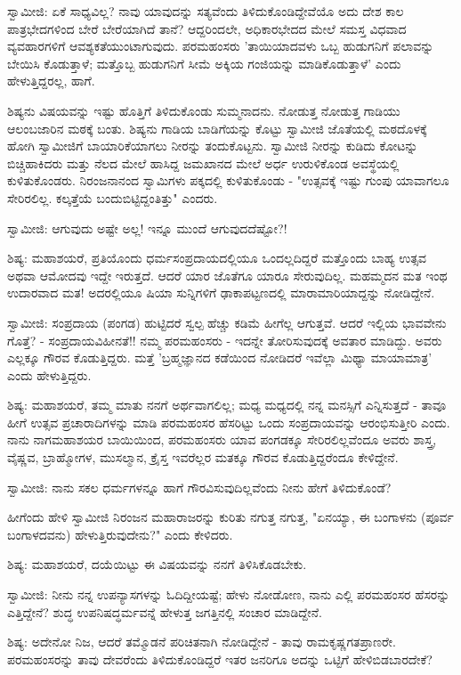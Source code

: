 ಸ್ವಾಮೀಜಿ: ಏಕೆ ಸಾಧ್ಯವಿಲ್ಲ? ನಾವು ಯಾವುದನ್ನು ಸತ್ಯವೆಂದು ತಿಳಿದುಕೊಂಡಿದ್ದೇವೆಯೊ ಅದು ದೇಶ ಕಾಲ ಪಾತ್ರಭೇದಗಳಿಂದ ಬೇರೆ ಬೇರೆಯಾಗಿದೆ ತಾನೆ? ಆದ್ದರಿಂದಲೇ, ಅಧಿಕಾರಭೇದದ ಮೇಲೆ ಸಮಸ್ತ ವಿಧವಾದ ವ್ಯವಹಾರಗಳಿಗೆ ಆವಶ್ಯಕತೆಯುಂಟಾಗುವುದು. ಪರಮಹಂಸರು 'ತಾಯಿಯಾದವಳು ಒಬ್ಬ ಹುಡುಗನಿಗೆ ಪಲಾವನ್ನು ಬೇಯಿಸಿ ಕೊಡುತ್ತಾಳೆ; ಮತ್ತೊಬ್ಬ ಹುಡುಗನಿಗೆ ಸೀಮೆ ಅಕ್ಕಿಯ ಗಂಜಿಯನ್ನು ಮಾಡಿಕೊಡುತ್ತಾಳೆ' ಎಂದು ಹೇಳುತ್ತಿದ್ದರಲ್ಲ, ಹಾಗೆ.

ಶಿಷ್ಯನು ವಿಷಯವನ್ನು ಇಷ್ಟು ಹೊತ್ತಿಗೆ ತಿಳಿದುಕೊಂಡು ಸುಮ್ಮನಾದನು. ನೋಡುತ್ತ ನೋಡುತ್ತ ಗಾಡಿಯು ಆಲಂಬಜಾರಿನ ಮಠಕ್ಕೆ ಬಂತು. ಶಿಷ್ಯನು ಗಾಡಿಯ ಬಾಡಿಗೆಯನ್ನು ಕೊಟ್ಟು ಸ್ವಾಮೀಜಿ ಜೊತೆಯಲ್ಲಿ ಮಠದೊಳಕ್ಕೆ ಹೋಗಿ ಸ್ವಾಮೀಜಿಗೆ ಬಾಯಾರಿಕೆಯಾಗಲು ನೀರನ್ನು ತಂದುಕೊಟ್ಟನು. ಸ್ವಾಮೀಜಿ ನೀರನ್ನು ಕುಡಿದು ಕೋಟನ್ನು ಬಿಚ್ಚಿಹಾಕಿದರು ಮತ್ತು ನೆಲದ ಮೇಲೆ ಹಾಸಿದ್ದ ಜಮಖಾನದ ಮೇಲೆ ಅರ್ಧ ಉರುಳಿಕೊಂಡ ಅವಸ್ಥೆಯಲ್ಲಿ ಕುಳಿತುಕೊಂಡರು. ನಿರಂಜನಾನಂದ ಸ್ವಾಮಿಗಳು ಪಕ್ಕದಲ್ಲಿ ಕುಳಿತುಕೊಂಡು - "ಉತ್ಸವಕ್ಕೆ ಇಷ್ಟು ಗುಂಪು ಯಾವಾಗಲೂ ಸೇರಿರಲಿಲ್ಲ. ಕಲ್ಕತ್ತೆಯೆ ಬಂದುಬಿಟ್ಟಿದ್ದಂತಿತ್ತು" ಎಂದರು.

ಸ್ವಾಮೀಜಿ: ಆಗುವುದು ಅಷ್ಟೇ ಅಲ್ಲ! ಇನ್ನೂ ಮುಂದೆ ಆಗುವುದದೆಷ್ಟೋ?!

ಶಿಷ್ಯ: ಮಹಾಶಯರೆ, ಪ್ರತಿಯೊಂದು ಧರ್ಮಸಂಪ್ರದಾಯದಲ್ಲಿಯೂ ಒಂದಲ್ಲದಿದ್ದರೆ ಮತ್ತೊಂದು ಬಾಹ್ಯ ಉತ್ಸವ ಅಥವಾ ಆಮೋದವು ಇದ್ದೇ ಇರುತ್ತದೆ. ಆದರೆ ಯಾರ ಜೊತೆಗೂ ಯಾರೂ ಸೇರುವುದಿಲ್ಲ. ಮಹಮ್ಮದನ ಮತ ಇಂಥ ಉದಾರವಾದ ಮತ! ಅದರಲ್ಲಿಯೂ ಷಿಯಾ ಸುನ್ನಿಗಳಿಗೆ ಢಾಕಾಪಟ್ಟಣದಲ್ಲಿ ಮಾರಾಮಾರಿಯಾದ್ದನ್ನು ನೋಡಿದ್ದೇನೆ.

ಸ್ವಾಮೀಜಿ: ಸಂಪ್ರದಾಯ (ಪಂಗಡ) ಹುಟ್ಟಿದರೆ ಸ್ವಲ್ಪ ಹೆಚ್ಚು ಕಡಿಮೆ ಹೀಗೆಲ್ಲ ಆಗುತ್ತವೆ. ಆದರೆ ಇಲ್ಲಿಯ ಭಾವವೇನು ಗೊತ್ತೆ? - ಸಂಪ್ರದಾಯವಿಹೀನತೆ!! ನಮ್ಮ ಪರಮಹಂಸರು - ಇದನ್ನೇ ತೋರಿಸುವುದಕ್ಕೆ ಅವತಾರ ಮಾಡಿದ್ದು. ಅವರು ಎಲ್ಲಕ್ಕೂ ಗೌರವ ಕೊಡುತ್ತಿದ್ದರು. ಮತ್ತೆ 'ಬ್ರಹ್ಮಜ್ಞಾನದ ಕಡೆಯಿಂದ ನೋಡಿದರೆ ಇವೆಲ್ಲಾ ಮಿಥ್ಯಾ ಮಾಯಾಮಾತ್ರ' ಎಂದು ಹೇಳುತ್ತಿದ್ದರು.

ಶಿಷ್ಯ: ಮಹಾಶಯರೆ, ತಮ್ಮ ಮಾತು ನನಗೆ ಅರ್ಥವಾಗಲಿಲ್ಲ; ಮಧ್ಯ ಮಧ್ಯದಲ್ಲಿ ನನ್ನ ಮನಸ್ಸಿಗೆ ಎನ್ನಿಸುತ್ತದೆ - ತಾವೂ ಹೀಗೆ ಉತ್ಸವ ಪ್ರಚಾರಾದಿಗಳನ್ನು ಮಾಡಿ ಪರಮಹಂಸರ ಹೆಸರಿಟ್ಟು ಒಂದು ಸಂಪ್ರದಾಯವನ್ನು ಆರಂಭಿಸುತ್ತೀರಿ ಎಂದು. ನಾನು ನಾಗಮಹಾಶಯರ ಬಾಯಿಯಿಂದ, ಪರಮಹಂಸರು ಯಾವ ಪಂಗಡಕ್ಕೂ ಸೇರಿರಲಿಲ್ಲವೆಂದೂ ಅವರು ಶಾಸ್ತ್ರ, ವೈಷ್ಣವ, ಬ್ರಾಹ್ಮೋಗಳ, ಮುಸಲ್ಮಾನ, ಕ್ರೈಸ್ತ ಇವರೆಲ್ಲರ ಮತಕ್ಕೂ ಗೌರವ ಕೊಡುತ್ತಿದ್ದರೆಂದೂ ಕೇಳಿದ್ದೇನೆ.

ಸ್ವಾಮೀಜಿ: ನಾನು ಸಕಲ ಧರ್ಮಗಳನ್ನೂ ಹಾಗೆ ಗೌರವಿಸುವುದಿಲ್ಲವೆಂದು ನೀನು ಹೇಗೆ ತಿಳಿದುಕೊಂಡೆ?

ಹೀಗೆಂದು ಹೇಳಿ ಸ್ವಾಮೀಜಿ ನಿರಂಜನ ಮಹಾರಾಜರನ್ನು ಕುರಿತು ನಗುತ್ತ ನಗುತ್ತ, "ಏನಯ್ಯಾ, ಈ ಬಂಗಾಳನು (ಪೂರ್ವ ಬಂಗಾಳದವನು) ಹೇಳುತ್ತಿರುವುದೇನು?" ಎಂದು ಕೇಳಿದರು.

ಶಿಷ್ಯ: ಮಹಾಶಯರೆ, ದಯೆಯಿಟ್ಟು ಈ ವಿಷಯವನ್ನು ನನಗೆ ತಿಳಿಸಿಕೊಡಬೇಕು.

ಸ್ವಾಮೀಜಿ: ನೀನು ನನ್ನ ಉಪನ್ಯಾಸಗಳನ್ನು ಓದಿದ್ದೀಯಷ್ಟೆ; ಹೇಳು ನೋಡೋಣ, ನಾನು ಎಲ್ಲಿ ಪರಮಹಂಸರ ಹೆಸರನ್ನು ಎತ್ತಿದ್ದೇನೆ? ಶುದ್ಧ ಉಪನಿಷದ್ಧರ್ಮವನ್ನೆ ಹೇಳುತ್ತ ಜಗತ್ತಿನಲ್ಲಿ ಸಂಚಾರ ಮಾಡಿದ್ದೇನೆ.

ಶಿಷ್ಯ: ಅದೇನೋ ನಿಜ, ಆದರೆ ತಮ್ಮೊಡನೆ ಪರಿಚಿತನಾಗಿ ನೋಡಿದ್ದೇನೆ - ತಾವು ರಾಮಕೃಷ್ಣಗತಪ್ರಾಣರೇ. ಪರಮಹಂಸರನ್ನು ತಾವು ದೇವರೆಂದು ತಿಳಿದುಕೊಂಡಿದ್ದರೆ ಇತರ ಜನರಿಗೂ ಅದನ್ನು ಒಟ್ಟಿಗೆ ಹೇಳಿಬಿಡಬಾರದೇಕೆ?

